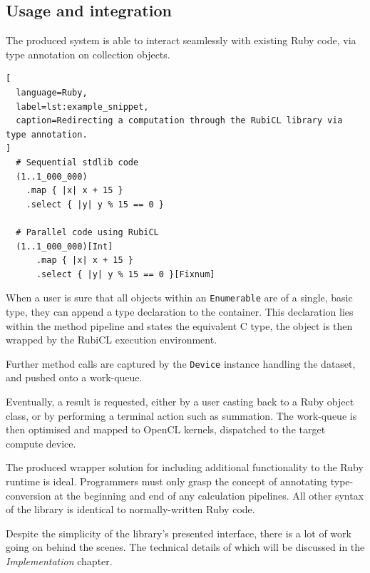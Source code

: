 \subsection{Usage and integration}
The produced system is able to interact seamlessly with existing Ruby code, via type annotation on collection objects.

\begin{lstlisting}[
  language=Ruby,
  label=lst:example_snippet,
  caption=Redirecting a computation through the RubiCL library via type annotation.
]
  # Sequential stdlib code
  (1..1_000_000)
    .map { |x| x + 15 }
    .select { |y| y % 15 == 0 }

  # Parallel code using RubiCL
  (1..1_000_000)[Int]
      .map { |x| x + 15 }
      .select { |y| y % 15 == 0 }[Fixnum]
\end{lstlisting}


When a user is sure that all objects within an \verb|Enumerable| are of a single, basic type, they can append a type declaration to the container. This declaration lies within the method pipeline and states the equivalent C type, the object is then wrapped by the RubiCL execution environment.

Further method calls are captured by the \verb|Device| instance handling the dataset, and pushed onto a work-queue.

Eventually, a result is requested, either by a user casting back to a Ruby object class, or by performing a terminal action such as summation. The work-queue is then optimised and mapped to OpenCL kernels, dispatched to the target compute device.

The produced wrapper solution for including additional functionality to the Ruby runtime is ideal. Programmers must only grasp the concept of annotating type-conversion at the beginning and end of any calculation pipelines. All other syntax of the library is identical to normally-written Ruby code.

Despite the simplicity of the library's presented interface, there is a lot of work going on behind the scenes. The technical details of which will be discussed in the \emph{Implementation} chapter.

